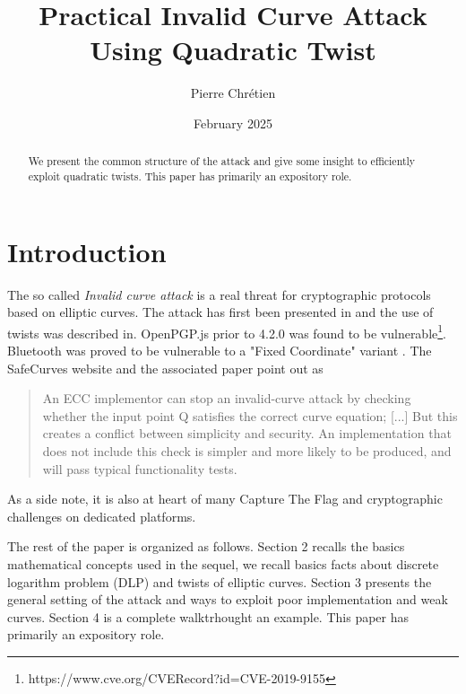 \documentclass[10pt]{article}
\theoremstyle{definition}
\begin{document}

\author{Pierre Chrétien}
\title{Practical Invalid Curve Attack Using Quadratic Twist}
\date{February 2025}
\maketitle
\begin{abstract}
We present the common structure of the attack and give some insight to efficiently exploit quadratic twists. 
This paper has primarily an expository role.
\end{abstract}


\section{Introduction}

The so called \textsl{Invalid curve attack} is a real threat for cryptographic protocols based on elliptic curves.
The attack has first been presented in \cite{BMM00} and the use of twists was described in\cite{FLRV08}.
OpenPGP.js prior to 4.2.0 was found to be vulnerable\footnote{https://www.cve.org/CVERecord?id=CVE-2019-9155}. 
Bluetooth was proved to be vulnerable to a "Fixed Coordinate" variant  \cite{cryptoeprint:2019/1043}.
The SafeCurves website and the associated paper \cite{cryptoeprint:2024/1265} point out as 
\begin{quote}
An ECC implementor can stop an invalid-curve attack by checking whether the input point Q satisfies the correct curve equation; [...]
But this creates a conflict between simplicity and security. An implementation that does not include this check is simpler and more likely to be produced, and will pass typical functionality tests. 
\end{quote}

\noindent As a side note, it is also at heart of many Capture The Flag and cryptographic challenges on dedicated platforms.

\vspace*{.5cm}
\noindent The rest of the paper is organized as follows.
Section 2 recalls the basics mathematical concepts used  in the sequel, we recall basics facts about discrete logarithm problem (DLP) and twists of elliptic curves.	
Section 3 presents the general setting of the attack and ways to exploit poor implementation and weak curves.
Section 4 is a complete walktrhought an example.
This paper has primarily an expository role.
\end{document}
